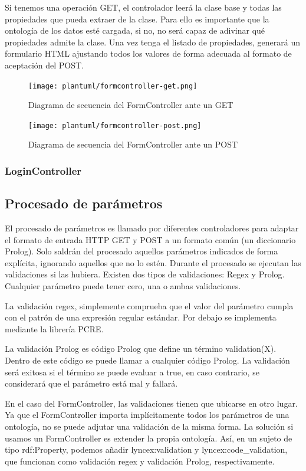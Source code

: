 \documentclass[12pt]{report} %
\begin{document}
Si tenemos una operación GET, el controlador leerá la clase base y todas las propiedades que pueda extraer de la clase. Para ello es importante que la ontología de los datos esté cargada, si no, no será capaz de adivinar qué propiedades admite la clase.
Una vez tenga el listado de propiedades, generará un formulario HTML ajustando todos los valores de forma adecuada al formato de aceptación del POST.

\begin{figure}[h]
    \centering
    \texttt{[image: plantuml/formcontroller-get.png]}
    \caption{Diagrama de secuencia del FormController ante un GET}
    \label{fig:formcontrollerget}
\end{figure}

\begin{figure}[h]
    \centering
    \texttt{[image: plantuml/formcontroller-post.png]}
    \caption{Diagrama de secuencia del FormController ante un POST}
    \label{fig:formcontrollerpost}
\end{figure}

\subsubsection{LoginController}

\subsection{Procesado de parámetros}
El procesado de parámetros es llamado por diferentes controladores para adaptar el formato de entrada HTTP GET y POST a un formato común (un diccionario Prolog).
Solo saldrán del procesado aquellos parámetros indicados de forma explícita, ignorando aquellos que no lo estén.
Durante el procesado se ejecutan las validaciones si las hubiera. Existen dos tipos de validaciones: Regex y Prolog.
Cualquier parámetro puede tener cero, una o ambas validaciones.

La validación regex, simplemente comprueba que el valor del parámetro cumpla con el patrón de una expresión regular estándar. Por debajo se implementa mediante la librería PCRE.

La validación Prolog es código Prolog que define un término validation(X). Dentro de este código se puede llamar a cualquier código Prolog.
La validación será exitosa si el término se puede evaluar a true, en caso contrario, se considerará que el parámetro está mal y fallará.

En el caso del FormController, las validaciones tienen que ubicarse en otro lugar. Ya que el FormController importa implícitamente todos los parámetros de una ontología, no se puede adjutar una validación de la misma forma.
La solución si usamos un FormController es extender la propia ontología.
Así, en un sujeto de tipo rdf:Property, podemos añadir lyncex:validation y lyncex:code\_validation, que funcionan como validación regex y validación Prolog, respectivamente.
\end{document}
